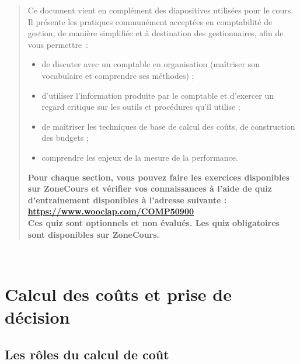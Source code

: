 \documentclass{tufte-handout}
\begin{document}
\begin{quote}
Ce document vient en complément des diapositives utilisées pour le cours. Il présente les pratiques communément acceptées en comptabilité de gestion, de manière simplifiée et à destination des gestionnaires, afin de vous permettre :\\
\begin{itemize}
\item de discuter avec un comptable en organisation (maîtriser son vocabulaire et comprendre ses méthodes) ;\\
\item d'utiliser l’information produite par le comptable et d'exercer un regard critique sur les outils et procédures qu’il utilise ;\\
\item de maîtriser les techniques de base de calcul des coûts, de construction des budgets ;\\
\item comprendre les enjeux de la mesure de la performance.\\
\end{itemize}
\textbf{Pour chaque section, vous pouvez faire les exercices disponibles sur ZoneCours et vérifier vos connaissances à l'aide de quiz d’entrainement disponibles à l'adresse suivante : \url{https://www.wooclap.com/COMP50900} \\
Ces quiz sont optionnels et non évalués. Les quiz obligatoires sont disponibles sur ZoneCours.}\\
\end{quote}
\clearpage\\
\section{Calcul des coûts et prise de décision}
\label{sec:org0e387f8}
\subsection{Les rôles du calcul de coût}
\label{sec:org64af1d8}
\end{document}
